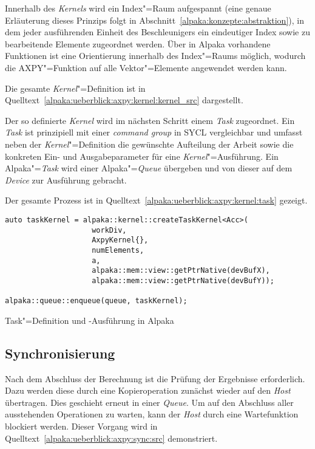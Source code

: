 Innerhalb des \textit{Kernels} wird ein Index"=Raum aufgespannt (eine genaue Erläuterung
dieses Prinzips folgt in Abschnitt~\ref{alpaka:konzepte:abstraktion}), in dem
jeder ausführenden Einheit des Beschleunigers ein eindeutiger Index sowie zu
bearbeitende Elemente zugeordnet werden. Über in Alpaka vorhandene Funktionen
ist eine Orientierung innerhalb des Index"=Raums möglich, wodurch die
AXPY"=Funktion auf alle Vektor"=Elemente angewendet werden kann.

Die gesamte \textit{Kernel}"=Definition ist in
Quelltext~\ref{alpaka:ueberblick:axpy:kernel:kernel_src} dargestellt.

Der so definierte \textit{Kernel} wird im nächsten Schritt einem \textit{Task}
zugeordnet. Ein \textit{Task} ist prinzipiell mit einer \textit{command group}
in SYCL vergleichbar und umfasst neben der \textit{Kernel}"=Definition die gewünschte
Aufteilung der Arbeit sowie die konkreten Ein- und Ausgabeparameter für eine
\textit{Kernel}"=Ausführung. Ein Alpaka"=\textit{Task} wird einer Alpaka"=\textit{Queue}
übergeben und von dieser auf dem \textit{Device} zur Ausführung gebracht.

Der gesamte Prozess ist in Quelltext~\ref{alpaka:ueberblick:axpy:kernel:task}
gezeigt.

\begin{code}
    \begin{verbatim}
auto taskKernel = alpaka::kernel::createTaskKernel<Acc>(
                    workDiv,
                    AxpyKernel{},
                    numElements,
                    a,
                    alpaka::mem::view::getPtrNative(devBufX),
                    alpaka::mem::view::getPtrNative(devBufY));

alpaka::queue::enqueue(queue, taskKernel);
    \end{verbatim}
    \caption{Task"=Definition und -Ausführung in Alpaka}
    \label{alpaka:ueberblick:axpy:kernel:task}
\end{code}

\subsection{Synchronisierung}
\label{alpaka:ueberblick:axpy:sync}

Nach dem Abschluss der Berechnung ist die Prüfung der Ergebnisse erforderlich.
Dazu werden diese durch eine Kopieroperation zunächst wieder auf den
\textit{Host} übertragen. Dies geschieht erneut in einer \textit{Queue}. Um
auf den Abschluss aller ausstehenden Operationen zu warten, kann der
\textit{Host} durch eine Wartefunktion blockiert werden. Dieser Vorgang wird in
Quelltext~\ref{alpaka:ueberblick:axpy:sync:src} demonstriert.

